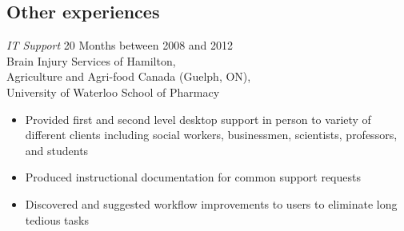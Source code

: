 \documentclass{res}
\newcommand{\inFrench}[1]{}
\newcommand{\inEnglish}[1]{#1}
\begin{document}
\begin{resume}
\inFrench{
	\section{Expériences connexes}
}
\inEnglish{
	\section{Other experiences}
}
\vspace{6pt}

%
%
%
%

\inEnglish{
	{\sl IT Support}
		\hfill 20 Months between 2008 and 2012 \\
	Brain Injury Services of Hamilton, \\
	Agriculture and Agri-food Canada (Guelph, ON), \\
	University of Waterloo School of Pharmacy

	\vspace{0.05in}
	\begin{itemize} \itemsep -2pt
		\item Provided first and second level desktop support in person to variety of different clients including social workers, businessmen, scientists, professors, and students
		\item Produced instructional documentation for common support requests
		\item Discovered and suggested workflow improvements to users to eliminate long tedious tasks
	\end{itemize}


}
\end{resume}
\end{document}
